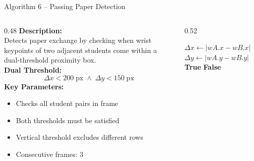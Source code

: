 \documentclass{beamer}
\begin{document}
\begin{frame}{Algorithm 6 -- Passing Paper Detection}
\begin{columns}
\begin{column}{0.48\textwidth}
\footnotesize
\textbf{Description:}\\
Detects paper exchange by checking when wrist keypoints of two adjacent students come within a dual-threshold proximity box.\\[0.3cm]
\textbf{Dual Threshold:}
\[
\Delta x < 200\;\text{px} \;\wedge\; \Delta y < 150\;\text{px}
\]
\textbf{Key Parameters:}
\begin{itemize}\footnotesize
    \item Checks all student pairs in frame
    \item Both thresholds must be satisfied
    \item Vertical threshold excludes different rows
    \item Consecutive frames: 3
\end{itemize}
\end{column}
\begin{column}{0.52\textwidth}
\begin{algorithmic}[1]
\footnotesize
{}
        \State $\Delta x \gets |wA.x - wB.x|$
        \State $\Delta y \gets |wA.y - wB.y|$
          \State \Return \textbf{True}
        \EndIf
      \EndFor
    \EndFor
  \EndFor
  \State \Return \textbf{False}
\EndFunction
\end{algorithmic}
\end{column}
\end{columns}
\end{frame}
\end{document}
